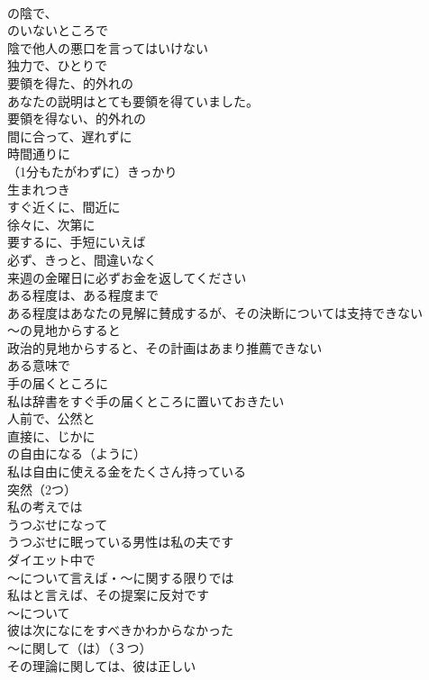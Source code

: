 \documentclass[8pt]{extreport}
\begin{document}
\begin{CJK}{UTF8}{min}
\\	の陰で、
\\	のいないところで	
\\	陰で他人の悪口を言ってはいけない
\\	独力で、ひとりで	
\\	要領を得た、的外れの	
\\	あなたの説明はとても要領を得ていました。
\\	要領を得ない、的外れの	
\\	間に合って、遅れずに	
\\	時間通りに	
\\	（1分もたがわずに）きっかり	
\\	生まれつき	
\\	すぐ近くに、間近に	
\\	徐々に、次第に	
\\	要するに、手短にいえば	
\\	必ず、きっと、間違いなく	
\\	来週の金曜日に必ずお金を返してください
\\	ある程度は、ある程度まで	
\\	ある程度はあなたの見解に賛成するが、その決断については支持できない
\\	～の見地からすると	
\\	政治的見地からすると、その計画はあまり推薦できない
\\	ある意味で	
\\	手の届くところに	
\\	私は辞書をすぐ手の届くところに置いておきたい
\\	人前で、公然と	
\\	直接に、じかに	
\\	の自由になる（ように）	
\\	私は自由に使える金をたくさん持っている
\\	突然（2つ）	
\\	私の考えでは	
\\	うつぶせになって	
\\	うつぶせに眠っている男性は私の夫です
\\	ダイエット中で	
\\	～について言えば・～に関する限りでは	
\\	私はと言えば、その提案に反対です
\\	～について	
\\	彼は次になにをすべきかわからなかった
\\	～に関して（は）（３つ）	
\\	その理論に関しては、彼は正しい

\end{CJK}
\end{document}
